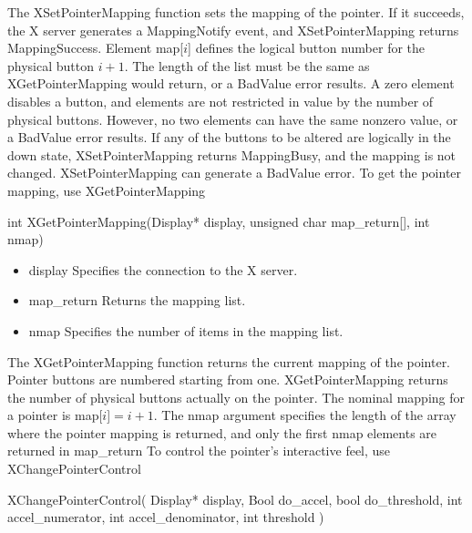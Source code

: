 \documentclass{report}
\begin{document}
\begin{itemize}
\begin{itemize}
            The XSetPointerMapping function sets the mapping of the pointer. If it succeeds, the X server generates a MappingNotify event, and XSetPointerMapping returns MappingSuccess. Element map[$i$] defines the logical button number for the physical button $i+1$. The length of the list must be the same as XGetPointerMapping would return, or a BadValue error results. A zero element disables a button, and elements are not restricted in value by the number of physical buttons. However, no two elements can have the same nonzero value, or a BadValue error results. If any of the buttons to be altered are logically in the down state, XSetPointerMapping returns MappingBusy, and the mapping is not changed.
            \bigbreak \noindent 
            XSetPointerMapping can generate a BadValue error.
            \bigbreak \noindent 
            To get the pointer mapping, use XGetPointerMapping
            \bigbreak \noindent 
            \begin{cppcode}
                int XGetPointerMapping(Display* display, unsigned char map_return[], int nmap)
            \end{cppcode}
            \begin{itemize}
                \item display Specifies the connection to the X server.
                \item map\_return Returns the mapping list.
                \item nmap Specifies the number of items in the mapping list.
            \end{itemize}
            The XGetPointerMapping function returns the current mapping of the pointer. Pointer buttons are numbered starting from one. XGetPointerMapping returns the number of physical buttons actually on the pointer. The nominal mapping for a pointer is map[$i$]$=i+1$. The nmap argument
            \bigbreak \noindent 
            specifies the length of the array where the pointer mapping is returned, and only the first nmap elements are returned in map\_return
            \bigbreak \noindent 
            To control the pointer’s interactive feel, use XChangePointerControl
            \bigbreak \noindent 
            \begin{cppcode}
            XChangePointerControl(
                Display* display,
                Bool do_accel,
                bool do_threshold,
                int accel_numerator,
                int accel_denominator,
                int threshold
            )
            \end{cppcode}

\end{itemize}
\end{itemize}
\end{document}
